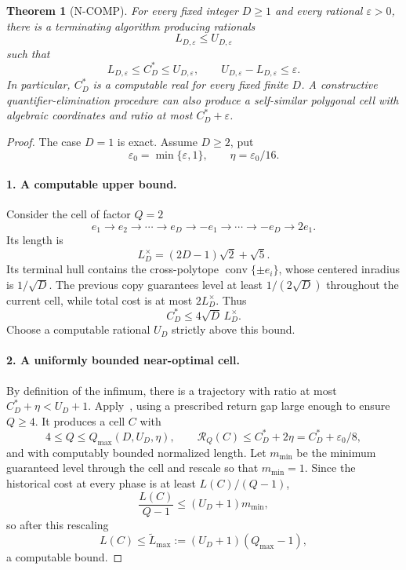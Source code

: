 \documentclass[10pt,a4paper]{article}
\newcommand{\conv}{\operatorname{conv}}
\newcommand{\cstar}{C^{*}}
\theoremstyle{plain}
\newtheorem{theorem}{Theorem}[section]
\theoremstyle{definition}
\theoremstyle{remark}
\begin{document}
\begin{theorem}[N-COMP]
For every fixed integer $D\ge1$ and every rational $\varepsilon>0$, there is a terminating algorithm producing rationals
\[
  L_{D,\varepsilon}\le U_{D,\varepsilon}
\]
such that
\[
  L_{D,\varepsilon}\le\cstar_D\le U_{D,\varepsilon},
  \qquad
  U_{D,\varepsilon}-L_{D,\varepsilon}\le\varepsilon.
\]
In particular, $\cstar_D$ is a computable real for every fixed finite $D$. A constructive quantifier-elimination procedure can also produce a self-similar polygonal cell with algebraic coordinates and ratio at most $\cstar_D+\varepsilon$.
\end{theorem}

\begin{proof}
The case $D=1$ is exact. Assume $D\ge2$, put
\[
  \varepsilon_0=\min\{\varepsilon,1\},
  \qquad
  \eta=\varepsilon_0/16.
\]

\paragraph{1. A computable upper bound.}
Consider the cell of factor $Q=2$
\[
  e_1\to e_2\to\cdots\to e_D\to-e_1\to\cdots\to-e_D\to2e_1.
\]
Its length is
\[
  L_D^\times=(2D-1)\sqrt2+\sqrt5.
\]
Its terminal hull contains the cross-polytope $\conv\{\pm e_i\}$, whose centered inradius is $1/\sqrt D$. The previous copy guarantees level at least $1/(2\sqrt D)$ throughout the current cell, while total cost is at most $2L_D^\times$. Thus
\[
  \cstar_D\le4\sqrt D\,L_D^\times.
\]
Choose a computable rational $U_D$ strictly above this bound.

\paragraph{2. A uniformly bounded near-optimal cell.}
By definition of the infimum, there is a trajectory with ratio at most $\cstar_D+\eta<U_D+1$. Apply~\cite[Theorem~5.1]{koch-cell}, using a prescribed return gap large enough to ensure $Q\ge4$. It produces a cell $C$ with
\[
  4\le Q\le Q_{\max}(D,U_D,\eta),
  \qquad
  \mathcal R_Q(C)\le\cstar_D+2\eta
  =\cstar_D+\varepsilon_0/8,
\]
and with computably bounded normalized length. Let $m_{\min}$ be the minimum guaranteed level through the cell and rescale so that $m_{\min}=1$. Since the historical cost at every phase is at least $L(C)/(Q-1)$,
\[
  \frac{L(C)}{Q-1}\le (U_D+1)m_{\min},
\]
so after this rescaling
\[
  L(C)\le\widetilde L_{\max}:=(U_D+1)(Q_{\max}-1),
\]
a computable bound.


\end{proof}
\end{document}
